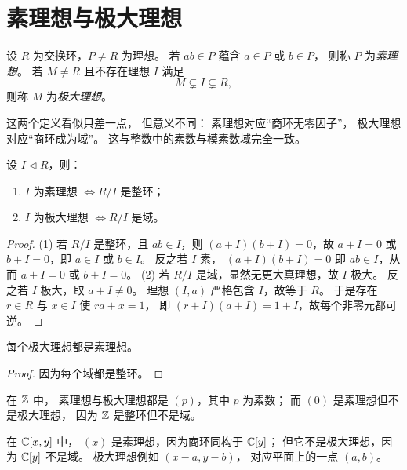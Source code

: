 \section{素理想与极大理想}
\begin{definition}
设 $R$ 为交换环，$P\ne R$ 为理想。 若 $ab\in P$ 蕴含 $a\in P$ 或 $b\in P$， 则称 $P$ 为\emph{素理想}。 若 $M\ne R$ 且不存在理想 $I$ 满足
\[
M\subsetneq I\subsetneq R,
\]
则称 $M$ 为\emph{极大理想}。
\end{definition}
这两个定义看似只差一点， 但意义不同： 素理想对应“商环无零因子”， 极大理想对应“商环成为域”。 这与整数中的素数与模素数域完全一致。
\begin{theorem}
设 $I\triangleleft R$，则：
\begin{enumerate}[label=(\arabic*)]
\item $I$ 为素理想 $\Longleftrightarrow R/I$ 是整环；
\item $I$ 为极大理想 $\Longleftrightarrow R/I$ 是域。
\end{enumerate}
\end{theorem}
\begin{proof}
(1) 若 $R/I$ 是整环，且 $ab\in I$，则 $(a+I)(b+I)=0$，故 $a+I=0$ 或 $b+I=0$，即 $a\in I$ 或 $b\in I$。 反之若 $I$ 素， $(a+I)(b+I)=0$ 即 $ab\in I$，从而 $a+I=0$ 或 $b+I=0$。 (2) 若 $R/I$ 是域，显然无更大真理想，故 $I$ 极大。 反之若 $I$ 极大，取 $a+I\ne 0$。 理想 $(I,a)$ 严格包含 $I$，故等于 $R$。 于是存在 $r\in R$ 与 $x\in I$ 使 $ra+x=1$， 即 $(r+I)(a+I)=1+I$，故每个非零元都可逆。
\end{proof}
\begin{corollary}
每个极大理想都是素理想。
\end{corollary}
\begin{proof}
因为每个域都是整环。
\end{proof}
\begin{example}
在 $\mathbb{Z}$ 中， 素理想与极大理想都是 $(p)$，其中 $p$ 为素数； 而 $(0)$ 是素理想但不是极大理想， 因为 $\mathbb{Z}$ 是整环但不是域。
\end{example}
\begin{example}
在 $\mathbb{C}[x,y]$ 中， $(x)$ 是素理想，因为商环同构于 $\mathbb{C}[y]$； 但它不是极大理想，因为 $\mathbb{C}[y]$ 不是域。 极大理想例如 $(x-a,y-b)$， 对应平面上的一点 $(a,b)$。
\end{example}
